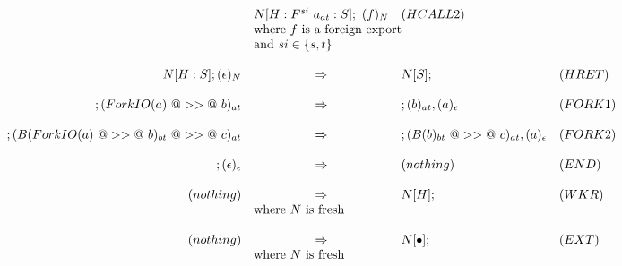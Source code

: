 \documentclass{article}
\newcommand{\hcall}{H}
\newcommand{\fcall}[2]{F^{#1}~#2}
\newcommand{\bound}[1]{B(#1)}
\newcommand{\forkio}[1]{ForkIO(#1)}
\begin{document}
$$\begin{array}{rcll}
	& N[\hcall : \fcall{si}{a_{at}} : S]; ~ (f)_{N} & (HCALL2) \\
	& \multicolumn{2}{l}{\mbox{where $f$ is a foreign export}} \\
	& \multicolumn{2}{l}{\mbox{and}~si \in \{s,t\}} \\
\\
N[\hcall : S]; (\epsilon)_N 
	& \Rightarrow 
	& N[S]; & (HRET) \\
\\
; (\forkio{a}~@>>@~b)_{at}
	& \Rightarrow
	& ; (b)_{at}, (a)_\epsilon & (FORK1) \\
\\
; (\bound{\forkio{a}~@>>@~b}_{bt}~@>>@~c)_{at}
	& \Rightarrow
	& ; (\bound{b}_{bt}~@>>@~c)_{at}, (a)_\epsilon & (FORK2) \\
\\
; (\epsilon)_\epsilon
	& \Rightarrow
	& (nothing) & (END) \\
\\
(nothing)
	& \Rightarrow 
	& N[\hcall]; & (WKR) \\
	& \multicolumn{2}{l}{\mbox{where $N$ is fresh}} \\
\\
(nothing)
	& \Rightarrow 
	& N[\bullet]; & (EXT) \\
	& \multicolumn{2}{l}{\mbox{where $N$ is fresh}} \\
\end{array}
$$
\end{document}
